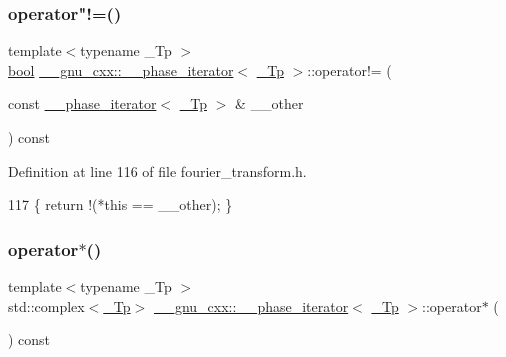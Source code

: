 \subsubsection{\texorpdfstring{operator"!=()}{operator!=()}}
{\footnotesize\ttfamily template$<$typename \+\_\+\+Tp $>$ \\
\hyperlink{namespace____gnu__cxx_ae83aca57f97767d5d09188718728a0ac}{bool} \hyperlink{class____gnu__cxx_1_1____phase__iterator}{\+\_\+\+\_\+gnu\+\_\+cxx\+::\+\_\+\+\_\+phase\+\_\+iterator}$<$ \hyperlink{namespace____gnu__cxx_a3b19a9c800ca194374ef9172290f7d79}{\+\_\+\+Tp} $>$\+::operator!= (\begin{DoxyParamCaption}\item[{const \hyperlink{class____gnu__cxx_1_1____phase__iterator}{\+\_\+\+\_\+phase\+\_\+iterator}$<$ \hyperlink{namespace____gnu__cxx_a3b19a9c800ca194374ef9172290f7d79}{\+\_\+\+Tp} $>$ \&}]{\+\_\+\+\_\+other }\end{DoxyParamCaption}) const\hspace{0.3cm}{\ttfamily [inline]}}



Definition at line 116 of file fourier\+\_\+transform.\+h.


\begin{DoxyCode}
117       \{ \textcolor{keywordflow}{return} !(*\textcolor{keyword}{this} == \_\_other); \}
\end{DoxyCode}
\mbox{\label{class____gnu__cxx_1_1____phase__iterator_afdc5bcce2768619f94cd8da8d0be2a75}} 
\subsubsection{\texorpdfstring{operator$\ast$()}{operator*()}}
{\footnotesize\ttfamily template$<$typename \+\_\+\+Tp $>$ \\
std\+::complex$<$\hyperlink{namespace____gnu__cxx_a3b19a9c800ca194374ef9172290f7d79}{\+\_\+\+Tp}$>$ \hyperlink{class____gnu__cxx_1_1____phase__iterator}{\+\_\+\+\_\+gnu\+\_\+cxx\+::\+\_\+\+\_\+phase\+\_\+iterator}$<$ \hyperlink{namespace____gnu__cxx_a3b19a9c800ca194374ef9172290f7d79}{\+\_\+\+Tp} $>$\+::operator$\ast$ (\begin{DoxyParamCaption}{ }\end{DoxyParamCaption}) const\hspace{0.3cm}{\ttfamily [inline]}}



